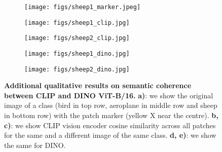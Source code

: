 \documentclass[10pt,twocolumn,letterpaper]{article}
\begin{document}
\begin{figure}[!t]
    \begin{subfigure}{0.18\linewidth}
        \centering
        \texttt{[image: figs/sheep1\_marker.jpeg]}
        \caption{}
        \vspace{-2mm}
    \end{subfigure}
    \begin{subfigure}{0.18\linewidth}
        \centering
        \texttt{[image: figs/sheep1\_clip.jpg]}
        \caption{}
        \vspace{-2mm}
    \end{subfigure}
    \begin{subfigure}{0.17\linewidth}
        \centering
        \texttt{[image: figs/sheep2\_clip.jpg]}
        \caption{}
        \vspace{-2mm}
    \end{subfigure}
    \begin{subfigure}{0.18\linewidth}
        \centering
        \texttt{[image: figs/sheep1\_dino.jpg]}
        \caption{}
        \vspace{-2mm}
    \end{subfigure}
    \begin{subfigure}{0.17\linewidth}
        \centering
        \texttt{[image: figs/sheep2\_dino.jpg]}
        \caption{}
        \vspace{-2mm}
    \end{subfigure}
    \caption{\textbf{Additional qualitative results on semantic coherence between CLIP and DINO ViT-B/16.} \textbf{a)}: we show the original image of a class (bird in top row, aeroplane in middle row and sheep in bottom row) with the patch marker (yellow X near the centre). \textbf{b, c)}: we show CLIP vision encoder cosine similarity across all patches for the same and a different image of the same class. \textbf{d, e)}: we show the same for DINO.}
    \vspace{-4mm}
    \label{fig:app_coherence_qualitative}
\end{figure}
\end{document}
